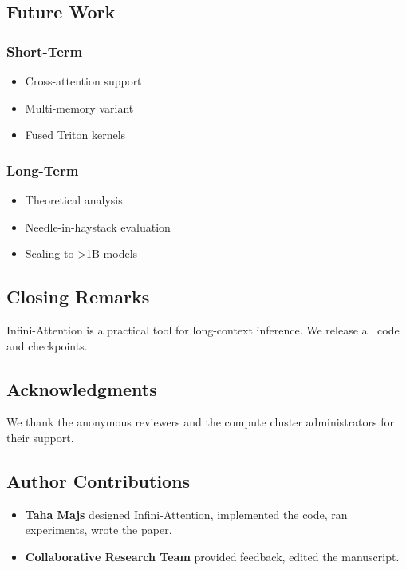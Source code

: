 \subsection{Future Work}

\subsubsection{Short-Term}
\begin{itemize}
\item Cross-attention support
\item Multi-memory variant
\item Fused Triton kernels

\end{itemize}
\subsubsection{Long-Term}
\begin{itemize}
\item Theoretical analysis
\item Needle-in-haystack evaluation
\item Scaling to >1B models

\end{itemize}
\subsection{Closing Remarks}

Infini-Attention is a practical tool for long-context inference. We release 
all code and checkpoints.

\subsection{Acknowledgments}

We thank the anonymous reviewers and the compute cluster administrators for their support.

\subsection{Author Contributions}

\begin{itemize}
\item \textbf{Taha Majs} designed Infini-Attention, implemented the code, ran
  experiments, wrote the paper.
\item \textbf{Collaborative Research Team} provided feedback, edited the manuscript.

\end{itemize}

